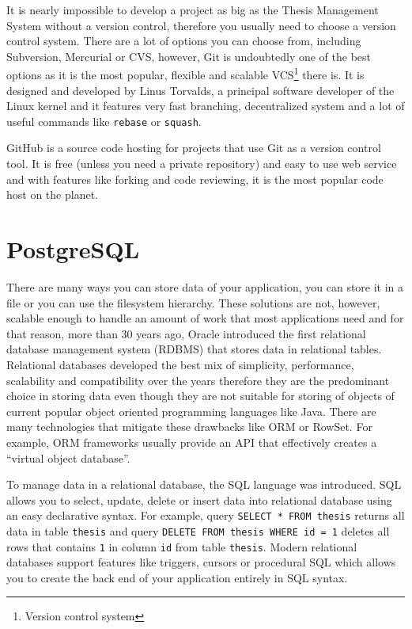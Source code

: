 It is nearly impossible to develop a project as big as the Thesis Management System without a version control, therefore you usually need to choose a version control system. There are a lot of options you can choose from, including Subversion, Mercurial or CVS, however, Git is undoubtedly one of the best options as it is the most popular, flexible and scalable VCS\footnote{Version control system} there is. It is designed and developed by Linus Torvalds, a principal software developer of the Linux kernel and it features very fast branching, decentralized system and a lot of useful commands like \texttt{rebase} or \texttt{squash}.

GitHub is a source code hosting for projects that use Git as a version control tool. It is free (unless you need a private repository) and easy to use web service and with features like forking and code reviewing, it is the most popular code host on the planet\cite{github-features}.

\section{PostgreSQL}

There are many ways you can store data of your application, you can store it in a file or you can use the filesystem hierarchy. These solutions are not, however, scalable enough to handle an amount of work that most applications need and for that reason, more than 30 years ago, Oracle introduced the first relational database management system (RDBMS) that stores data in relational tables. Relational databases developed the best mix of simplicity, performance, scalability and compatibility over the years therefore they are the predominant choice in storing data even though they are not suitable for storing of objects of current popular object oriented programming languages like Java. There are many technologies that mitigate these drawbacks like ORM or RowSet. For example, ORM frameworks usually provide an API that effectively creates a ``virtual object database''.

To manage data in a relational database, the SQL language was introduced. SQL allows you to select, update, delete or insert data into relational database using an easy declarative syntax. For example, query \texttt{SELECT * FROM thesis} returns all data in table \texttt{thesis} and query \texttt{DELETE FROM thesis WHERE id = 1} deletes all rows that contains \texttt{1} in column \texttt{id} from table \texttt{thesis}. Modern relational databases support features like triggers, cursors or procedural SQL which allows you to create the back end of your application entirely in SQL syntax.

